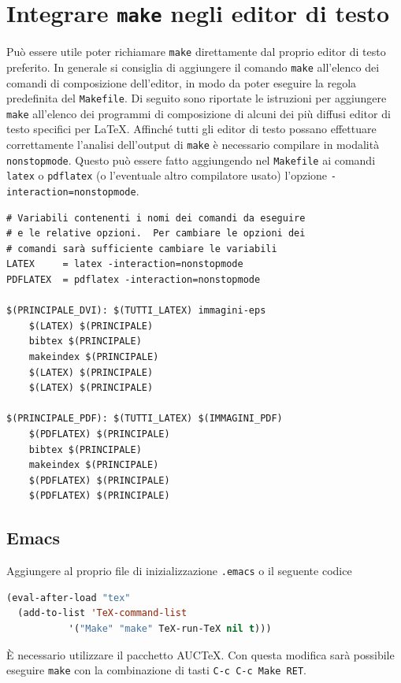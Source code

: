 \cleardoublepage{}
\chapter{Integrare \texttt{make} negli editor di testo}
\label{cha:editor}

Può essere utile poter richiamare \texttt{make} direttamente dal proprio editor
di testo preferito.  In generale si consiglia di aggiungere il comando
\texttt{make} all'elenco dei comandi di composizione dell'editor, in modo da
poter eseguire la regola predefinita del \texttt{Makefile}.  Di seguito sono
riportate le istruzioni per aggiungere \texttt{make} all'elenco dei programmi di
composizione di alcuni dei più diffusi editor di testo specifici per \LaTeX{}.
Affinché tutti gli editor di testo possano effettuare correttamente l'analisi
dell'output di \texttt{make} è necessario compilare in modalità
\texttt{nonstopmode}.  Questo può essere fatto aggiungendo nel \texttt{Makefile}
ai comandi \texttt{latex} o \texttt{pdflatex} (o l'eventuale altro compilatore
usato) l'opzione \texttt{-interaction=nonstopmode}.
\begin{lstlisting}
# Variabili contenenti i nomi dei comandi da eseguire
# e le relative opzioni.  Per cambiare le opzioni dei
# comandi sarà sufficiente cambiare le variabili
LATEX     = latex -interaction=nonstopmode
PDFLATEX  = pdflatex -interaction=nonstopmode

$(PRINCIPALE_DVI): $(TUTTI_LATEX) immagini-eps
	$(LATEX) $(PRINCIPALE)
	bibtex $(PRINCIPALE)
	makeindex $(PRINCIPALE)
	$(LATEX) $(PRINCIPALE)
	$(LATEX) $(PRINCIPALE)

$(PRINCIPALE_PDF): $(TUTTI_LATEX) $(IMMAGINI_PDF)
	$(PDFLATEX) $(PRINCIPALE)
	bibtex $(PRINCIPALE)
	makeindex $(PRINCIPALE)
	$(PDFLATEX) $(PRINCIPALE)
	$(PDFLATEX) $(PRINCIPALE)
\end{lstlisting}

\section{Emacs}
\label{sec:emacs}

Aggiungere al proprio file di inizializzazione \texttt{.emacs} o il seguente codice
\begin{lstlisting}[language=lisp,morekeywords={eval-after-load,add-to-list}]
(eval-after-load "tex"
  (add-to-list 'TeX-command-list
	       '("Make" "make" TeX-run-TeX nil t)))
\end{lstlisting}
È necessario utilizzare il pacchetto AUC\TeX{}.
Con questa modifica sarà possibile eseguire \texttt{make} con la combinazione di
tasti \texttt{C-c C-c Make RET}.

